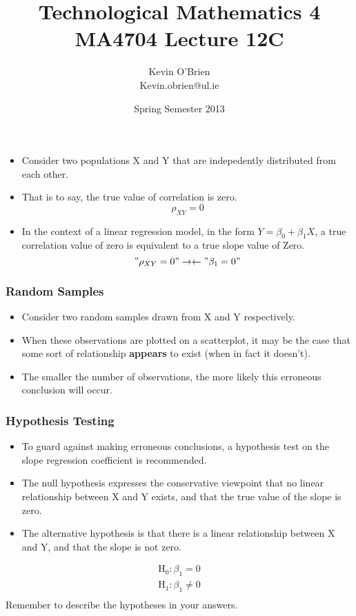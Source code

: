\documentclass[a4]{beamer}
\title[MA4704]{Technological Mathematics 4 \\ {\normalsize MA4704 Lecture 12C}}
\author[Kevin O'Brien]{Kevin O'Brien \\ {\scriptsize Kevin.obrien@ul.ie}}
\date{Spring Semester 2013}
\institute[Maths \& Stats]{Dept. of Mathematics \& Statistics, \\ University \textit{of} Limerick}
\begin{document}
\begin{frame}
\titlepage
\end{frame}

\begin{frame}
\begin{itemize}
\item Consider two populations X and Y that are indepedently distributed from
each other.
\item That is to say, the true value of correlation is zero.
\[\rho_{XY} = 0 \]
\item In the context of a linear regression model, in the form $Y=\beta_0  +  \beta_1X$, a true correlation value of zero is equivalent to a true slope value of Zero.
\["\rho_{XY} = 0" \rightarrow\leftarrow "\beta_1=0"\]
\end{itemize}
\end{frame}
\begin{frame}
\frametitle{Random Samples}
\begin{itemize}
\item Consider two random samples drawn from X and Y respectively.
\item When these observations are plotted on a scatterplot, it
may be the case that some sort of relationship \textbf{appears} to exist (when in fact it doesn't).
\item The smaller the number of observations, the more likely this erroneous conclusion will occur.
\end{itemize}
\end{frame}
\begin{frame}
\frametitle{Hypothesis Testing}
\begin{itemize}
\item To guard against making erroneous conclusions, a hypothesis test on the slope regression coefficient is
recommended.
\item The null hypothesis expresses the conservative viewpoint that no linear relationship between X and Y exists, and that the true value of the slope is zero.
\item The alternative hypothesis is that there is a linear relationship between X and Y, and that the slope is not zero.
\end{itemize}
\begin{eqnarray}
\mbox{H}_{0} : \beta_1 = 0 \\
\mbox{H}_{1} : \beta_1 \neq 0 \\
\end{eqnarray}
Remember to describe the hypotheses in your answers.
\end{frame}
\end{document}
